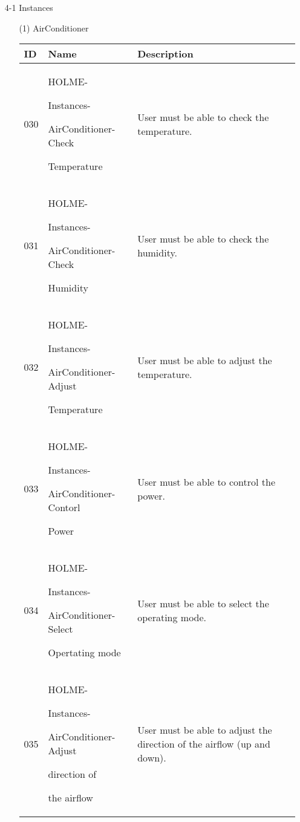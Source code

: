 \documentclass[conference]{IEEEtran}
\begin{document}
\begin{enumerate}
\clearpage
\item[4-1] Instances\\
\begin{itemize}
\item [(1)] AirConditioner
\begin{table}[h]
\def\arraystretch{1.2} \small
    \begin{tabular}{|p{1cm}|p{1.8cm}|p{5.0cm}|}
        \hline
        ID & Name & Description\\ \hline
         030 \par  & HOLME-\par Instances-\par AirConditioner-Check \par Temperature & User must be able to check the temperature.\\ \hline
         031 \par  & HOLME-\par Instances-\par AirConditioner-Check \par Humidity & User must be able to check the humidity.\\ \hline
         032 \par  & HOLME-\par Instances-\par AirConditioner-Adjust \par Temperature & User must be able to adjust the temperature.\\ \hline
         033 \par  & HOLME-\par Instances-\par AirConditioner-Contorl \par Power & User must be able to control the power.\\ \hline
         034 \par  & HOLME-\par Instances-\par AirConditioner-Select \par Opertating mode & User must be  able to select the operating mode.\\ \hline
         035 \par  & HOLME-\par Instances-\par AirConditioner-Adjust \par direction of \par the airflow & User must be able to adjust the direction of the airflow (up and down).\\ \hline

\end{tabular}
\end{table}
\end{itemize}
\end{enumerate}
\end{document}
